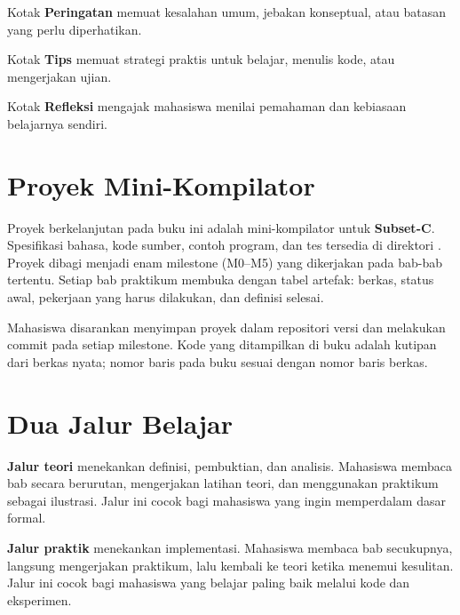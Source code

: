\begin{warningbox}
Kotak \textbf{Peringatan} memuat kesalahan umum, jebakan konseptual,
atau batasan yang perlu diperhatikan.
\end{warningbox}

\begin{tipsbox}
Kotak \textbf{Tips} memuat strategi praktis untuk belajar, menulis
kode, atau mengerjakan ujian.
\end{tipsbox}

\begin{reflectionbox}
Kotak \textbf{Refleksi} mengajak mahasiswa menilai pemahaman dan
kebiasaan belajarnya sendiri.
\end{reflectionbox}

\section*{Proyek Mini-Kompilator}

Proyek berkelanjutan pada buku ini adalah mini-kompilator untuk
\textbf{Subset-C}. Spesifikasi bahasa, kode sumber, contoh program,
dan tes tersedia di direktori . Proyek dibagi
menjadi enam milestone (M0--M5) yang dikerjakan pada bab-bab tertentu.
Setiap bab praktikum membuka dengan tabel artefak: berkas, status awal,
pekerjaan yang harus dilakukan, dan definisi selesai.

Mahasiswa disarankan menyimpan proyek dalam repositori versi dan
melakukan commit pada setiap milestone. Kode yang ditampilkan di buku
adalah kutipan dari berkas nyata; nomor baris pada buku sesuai dengan
nomor baris berkas.

\section*{Dua Jalur Belajar}

\textbf{Jalur teori} menekankan definisi, pembuktian, dan analisis.
Mahasiswa membaca bab secara berurutan, mengerjakan latihan teori, dan
menggunakan praktikum sebagai ilustrasi. Jalur ini cocok bagi mahasiswa
yang ingin memperdalam dasar formal.

\textbf{Jalur praktik} menekankan implementasi. Mahasiswa membaca bab
secukupnya, langsung mengerjakan praktikum, lalu kembali ke teori ketika
menemui kesulitan. Jalur ini cocok bagi mahasiswa yang belajar paling
baik melalui kode dan eksperimen.

